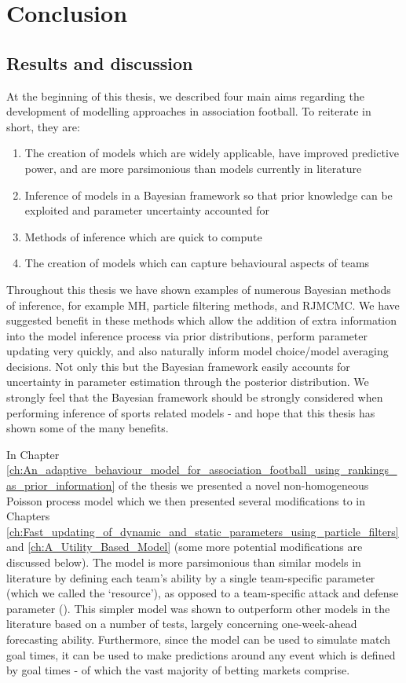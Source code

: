 
\singlespacing

\chapter{Conclusion}
\label{ch:Conclusion}

\onehalfspacing

\section{Results and discussion}

At the beginning of this thesis, we described four main aims regarding the development of modelling approaches in
association football. To reiterate in short, they are:
\begin{enumerate}
\item The creation of models which are widely applicable, have improved predictive power, and are more parsimonious than
models currently in literature
\item Inference of models in a Bayesian framework so that prior knowledge can be exploited and parameter uncertainty
accounted for
\item Methods of inference which are quick to compute
\item The creation of models which can capture behavioural aspects of teams
\end{enumerate}

Throughout this thesis we have shown examples of numerous Bayesian methods of inference, for example \gls{MH}, particle
filtering methods, and \gls{RJMCMC}. We have suggested benefit in these methods which allow the addition of extra
information into the model inference process via prior distributions, perform parameter updating very quickly, and also
naturally inform model choice/model averaging decisions. Not only this but the Bayesian framework easily accounts for
uncertainty in parameter estimation through the posterior distribution. We strongly feel that the Bayesian framework
should be strongly considered when performing inference of sports related models - and hope that this thesis has shown
some of the many benefits.

In Chapter \ref{ch:An_adaptive_behaviour_model_for_association_football_using_rankings_as_prior_information} of the
thesis we presented a novel non-homogeneous Poisson process model which we then presented several modifications to in
Chapters \ref{ch:Fast_updating_of_dynamic_and_static_parameters_using_particle_filters} and
\ref{ch:A_Utility_Based_Model} (some more potential modifications are discussed below). The model is more parsimonious
than similar models in literature by defining each team's ability by a single team-specific parameter (which we called
the `resource'), as opposed to a team-specific attack and defense parameter (\cite{Maher1982, DixonColes1997,
DixonRobinson1998}). This simpler model was shown to outperform other models in the literature based on a number of
tests, largely concerning one-week-ahead forecasting ability. Furthermore, since the model can be used to simulate match
goal times, it can be used to make predictions around any event which is defined by goal times - of which the vast
majority of betting markets comprise.

